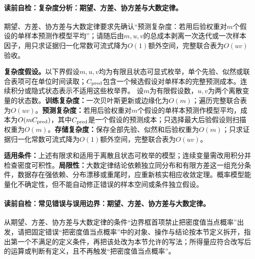 \label{struct:V1-C04-CH28}
\label{struct:V1-C04-CH29}
\paragraph{读前自检：复杂度分析：期望、方差、协方差与大数定律。}期望、方差、协方差与大数定律要求先确认“预测复杂度：若用后验权重对$m$个假设的单样本预测作模型平均”；请随后由$m,u,v$的总成本剥离一次迭代或一次样本因子，用只求证据归一化常数可流式降为$O(1)$额外空间，完整联合表为$O(uv)$验收。\par

\begin{complexitybox}
\textbf{复杂度假设。}以下界假设$m,u,v$均为有限且状态可显式枚举，单个先验、似然或联合表项可在单位时间读取；$C_{\rm pred}$包含一个候选假设对单样本的完整预测成本。连续积分或隐式状态表示不适用这些枚举界。
设$m$为有限假设数，$u,v$为两个离散变量的状态数。\textbf{训练复杂度：}一次贝叶斯更新或边缘化为$O(m)$；遍历完整联合表为$O(uv)$。\textbf{预测复杂度：}若用后验权重对$m$个假设的单样本预测作模型平均，成本为$O(mC_{\rm pred})$，其中$C_{\rm pred}$是一个假设的预测成本；只选择最大后验假设则扫描权重为$O(m)$。\textbf{存储复杂度：}保存全部先验、似然和后验权重为$O(m)$；只求证据归一化常数可流式降为$O(1)$额外空间，完整联合表为$O(uv)$。
\end{complexitybox}

\label{struct:V1-C04-CH30}
\label{struct:V1-C04-CH31}
\begin{applicabilitybox}
\textbf{适用条件：}上述有限求和适用于离散且状态可枚举的模型；连续变量需改用积分并检查密度可积性。\textbf{局限性：}大数定律结论依赖独立同分布和有限方差这一组充分条件，数据存在强依赖、分布漂移或重尾时，应重新核实相应收敛定理。概率模型能量化不确定性，但不能自动修正错误的样本空间或条件独立假设。
\end{applicabilitybox}

\label{struct:V1-C04-CH32}
\paragraph{读前自检：常见错误与误用边界：期望、方差、协方差与大数定律。}从期望、方差、协方差与大数定律的条件“边界框首项禁止把密度值当点概率”出发，请把固定错误“把密度值当点概率”中的对象、操作与结论按本节定义拆开，指出第一个不满足的定义条件，再把该处改为本节允许的写法；所得量应符合改写后的运算或判断有定义，且不再触发“把密度值当点概率”。\par


